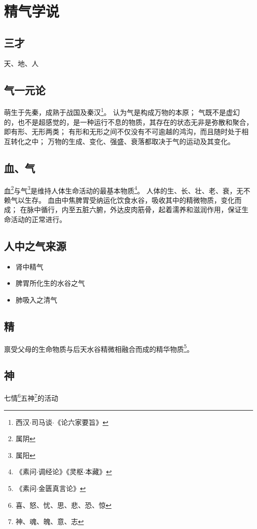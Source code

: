 \section{精气学说}

\subsection{三才}
天、地、人

\subsection{气一元论}
萌生于先秦，成熟于战国及秦汉\footnote{西汉$\cdot$司马谈$\cdot$《论六家要旨》}。
认为气是构成万物的本原；
气既不是虚幻的，也不是超感觉的，是一种运行不息的物质，其存在的状态无非是弥散和聚合，即有形、无形两类；
有形和无形之间不仅没有不可逾越的鸿沟，而且随时处于相互转化之中；
万物的生成、变化、强盛、衰落都取决于气的运动及其变化。

\subsection{血、气}
血\footnote{属阴}与气\footnote{属阳}是维持人体生命活动的最基本物质\footnote{《素问$\cdot$调经论》《灵枢$\cdot$本藏》}。
人体的生、长、壮、老、衰，无不赖气以生存。
血由中焦脾胃受纳运化饮食水谷，吸收其中的精微物质，变化而成；
在脉中循行，内至五脏六腑，外达皮肉筋骨，起着濡养和滋润作用，保证生命活动的正常进行。

\subsection{人中之气来源}
\begin{itemize}
  \item 肾中精气
  \item 脾胃所化生的水谷之气
  \item 肺吸入之清气
\end{itemize}

\subsection{精}
禀受父母的生命物质与后天水谷精微相融合而成的精华物质\footnote{《素问$\cdot$金匮真言论》}。

\subsection{神}
七情\footnote{喜、怒、忧、思、悲、恐、惊}五神\footnote{神、魂、魄、意、志}的活动
